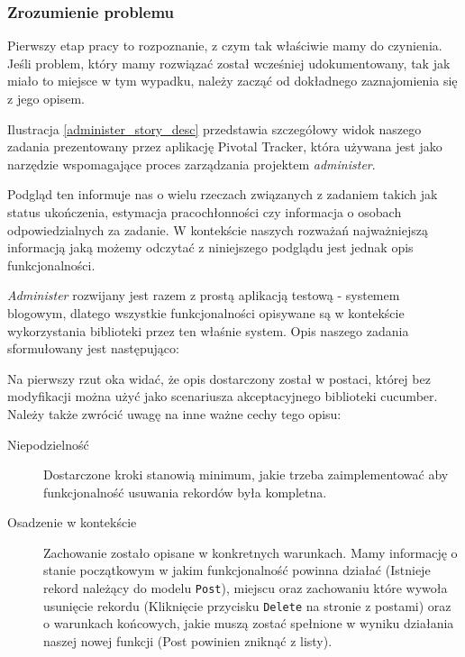     \subsubsection{Zrozumienie problemu}
    Pierwszy etap pracy to rozpoznanie, z czym tak właściwie mamy do czynienia. Jeśli problem, który mamy rozwiązać został wcześniej udokumentowany, tak jak miało to miejsce w tym wypadku, należy zacząć od dokładnego zaznajomienia się z jego opisem.
    
    Ilustracja \ref{administer_story_desc} przedstawia szczegółowy widok naszego zadania prezentowany przez aplikację Pivotal Tracker, która używana jest jako narzędzie wspomagające proces zarządzania projektem \emph{administer}.
    
    Podgląd ten informuje nas o wielu rzeczach związanych z zadaniem takich jak status ukończenia, estymacja pracochłonności czy informacja o osobach odpowiedzialnych za zadanie. W kontekście naszych rozważań najważniejszą informacją jaką możemy odczytać z niniejszego podglądu jest jednak opis funkcjonalności. 
    
    \emph{Administer} rozwijany jest razem z prostą aplikacją testową - systemem blogowym, dlatego wszystkie funkcjonalności opisywane są w kontekście wykorzystania biblioteki przez ten właśnie system. Opis naszego zadania sformułowany jest następująco:
    
    
    
    Na pierwszy rzut oka widać, że opis dostarczony został w postaci, której bez modyfikacji można użyć jako scenariusza akceptacyjnego biblioteki cucumber. Należy także zwrócić uwagę na inne ważne cechy tego opisu:
    
    \begin{description}
      \item[Niepodzielność] Dostarczone kroki stanowią minimum, jakie trzeba zaimplementować aby funkcjonalność usuwania rekordów była kompletna.
      \item[Osadzenie w kontekście] Zachowanie zostało opisane w konkretnych warunkach. Mamy informację o stanie początkowym w jakim funkcjonalność powinna działać (Istnieje rekord należący do modelu \texttt{Post}), miejscu oraz zachowaniu które wywoła usunięcie rekordu (Kliknięcie przycisku \texttt{Delete} na stronie z postami) oraz o warunkach końcowych, jakie muszą zostać spełnione w wyniku działania naszej nowej funkcji (Post powinien zniknąć z listy).
    \end{description}
    
